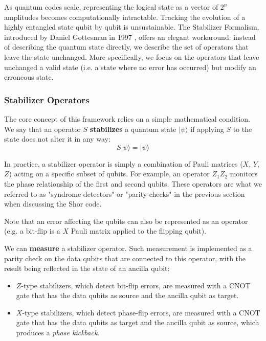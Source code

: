 As quantum codes scale, representing the logical state as a vector of $2^n$ amplitudes becomes computationally intractable. Tracking the evolution of a highly entangled state qubit by qubit is unsustainable. The Stabilizer Formalism, introduced by Daniel Gottesman in 1997 \cite{gottesman1997stabilizer}, offers an elegant workaround: instead of describing the quantum state directly, we describe the set of operators that leave the state unchanged. More specifically, we focus on the operators that leave unchanged a valid state (i.e. a state where no error has occurred) but modify an erroneous state.

\subsubsection{Stabilizer Operators}

The core concept of this framework relies on a simple mathematical condition. We say that an operator $S$ \textbf{stabilizes} a quantum state $\lvert \psi \rangle$ if applying $S$ to the state does not alter it in any way:
\begin{equation}
    S \lvert \psi \rangle = \lvert \psi \rangle
\end{equation}

In practice, a stabilizer operator is simply a combination of Pauli matrices ($X$, $Y$, $Z$) acting on a specific subset of qubits. For example, an operator $Z_1 Z_2$ monitors the phase relationship of the first and second qubits. These operators are what we referred to as "syndrome detectors" or "parity checks" in the previous section when discussing the Shor code.

Note that an error affecting the qubits can also be represented as an operator (e.g. a bit-flip is a $X$ Pauli matrix applied to the flipping qubit).

We can \textbf{measure} a stabilizer operator. Such measurement is implemented as a parity check on the data qubits that are connected to this operator, with the result being reflected in the state of an ancilla qubit:
\begin{itemize}
    \item $Z$-type stabilizers, which detect bit-flip errors, are measured with a $\text{CNOT}$ gate that has the data qubits as source and the ancilla qubit as target.
    \item $X$-type stabilizers, which detect phase-flip errors, are measured with a $\text{CNOT}$ gate that has the data qubits as target and the ancilla qubit as source, which produces a \textit{phase kickback}.
\end{itemize}

